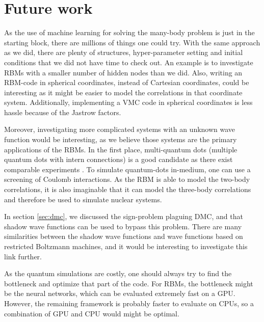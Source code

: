 \section*{Future work}
As the use of machine learning for solving the many-body problem is just in the starting block, there are millions of things one could try. With the same approach as we did, there are plenty of structures, hyper-parameter setting and initial conditions that we did not have time to check out. An example is to investigate RBMs with a smaller number of hidden nodes than we did. Also, writing an RBM-code in spherical coordinates, instead of Cartesian coordinates, could be interesting as it might be easier to model the correlations in that coordinate system. Additionally, implementing a VMC code in spherical coordinates is less hassle because of the Jastrow factors. 

Moreover, investigating more complicated systems with an unknown wave function would be interesting, as we believe those systems are the primary applications of the RBMs. In the first place, multi-quantum dots (multiple quantum dots with intern connections) is a good candidate as there exist comparable experiments \cite{marzin_photoluminescence_1994,brunner_sharp-line_1994}. To simulate quantum-dots in-medium, one can use a screening of Coulomb interactions. As the RBM is able to model the two-body correlations, it is also imaginable that it can model the three-body correlations and therefore be used to simulate nuclear systems.

In section \ref{sec:dmc}, we discussed the sign-problem plaguing DMC, and that shadow wave functions can be used to bypass this problem. There are many similarities between the shadow wave functions and wave functions based on restricted Boltzmann machines, and it would be interesting to investigate this link further. 

As the quantum simulations are costly, one should always try to find the bottleneck and optimize that part of the code. For RBMs, the bottleneck might be the neural networks, which can be evaluated extremely fast on a GPU. However, the remaining framework is probably faster to evaluate on CPUs, so a combination of GPU and CPU would might be optimal.